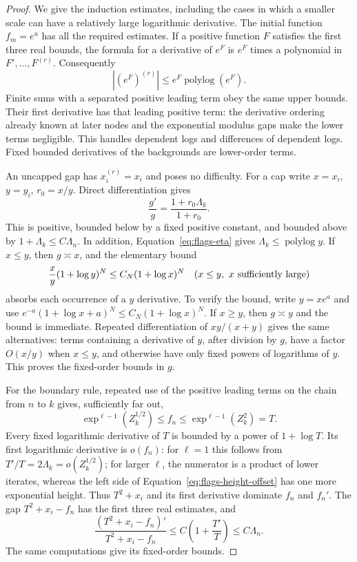 \begin{proof}
We give the induction estimates, including the cases in which a
smaller scale can have a relatively large logarithmic derivative.
The initial function $f_m=e^u$ has all the required estimates.
If a positive function $F$ satisfies the first three real bounds,
the formula for a derivative of $e^F$ is $e^F$ times a polynomial in
$F',\ldots,F^{(r)}$. Consequently
\begin{equation}\label{eq:flags-exp-derivative}
 |(e^F)^{(r)}|\le e^F\operatorname{polylog}(e^F).
\end{equation}
Finite sums with a separated positive leading term obey the same
upper bounds. Their first derivative has that leading positive term:
the derivative ordering already known at later nodes and the
exponential modulus gaps make the lower terms negligible. This
handles dependent logs and differences of dependent logs. Fixed
bounded derivatives of the backgrounds are lower-order terms.

An uncapped gap has $x_i^{(r)}=x_i$ and poses no difficulty. For a
cap write $x=x_i$, $y=y_i$, $r_0=x/y$. Direct differentiation gives
\begin{equation}\label{eq:flags-cap-derivative}
 \frac{g'}g=\frac{1+r_0\Lambda_k}{1+r_0}.
\end{equation}
This is positive, bounded below by a fixed positive constant, and
bounded above by $1+\Lambda_k\le C\Lambda_n$. In addition,
Equation~\eqref{eq:flags-eta} gives
$\Lambda_k\le\operatorname{polylog}y$. If $x\le y$, then
$g\asymp x$, and the elementary bound
\[
 \frac{x}{y}(1+\log y)^N\le C_N(1+\log x)^N
 \quad(x\le y,\ x\hbox{ sufficiently large})
\]
absorbs each occurrence of a $y$ derivative. To verify the bound,
write $y=xe^a$ and use
$e^{-a}(1+\log x+a)^N\le C_N(1+\log x)^N$.
If $x\ge y$, then $g\asymp y$ and the bound is immediate.
Repeated differentiation of $xy/(x+y)$ gives the same alternatives:
terms containing a derivative of $y$, after division by $g$, have a
factor $O(x/y)$ when $x\le y$, and otherwise have only fixed powers
of logarithms of $y$. This proves the fixed-order bounds in $g$.

For the boundary rule, repeated use of the positive leading terms
on the chain from $n$ to $k$ gives, sufficiently far out,
\begin{equation}\label{eq:flags-height-offset}
 \exp^{\ell-1}(Z_k^{1/2})\le f_n
       \le \exp^{\ell-1}(Z_k^2)=T.
\end{equation}
Every fixed logarithmic derivative of $T$ is bounded by a power of
$1+\log T$. Its first logarithmic derivative is $o(f_n)$: for
$\ell=1$ this follows from
$T'/T=2\Lambda_k=o(Z_k^{1/2})$; for larger $\ell$, the numerator
is a product of lower iterates, whereas the left side of
Equation~\eqref{eq:flags-height-offset} has one more exponential
height. Thus $T^2+x_i$ and its first derivative dominate $f_n$ and
$f_n'$. The gap $T^2+x_i-f_n$ has the first three real estimates,
and
\[
 \frac{(T^2+x_i-f_n)'}{T^2+x_i-f_n}
 \le C\left(1+\frac{T'}T\right)\le C\Lambda_n.
\]
The same computations give its fixed-order bounds.


\end{proof}
